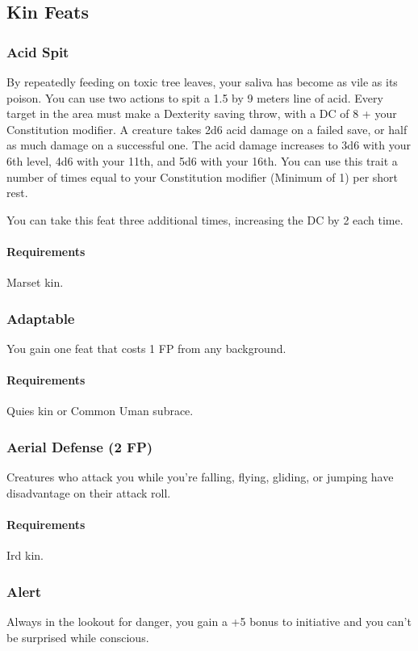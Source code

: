 \subsection*{Kin Feats}

\subsubsection{Acid Spit} \label{feat::acidspit}
    By repeatedly feeding on toxic tree leaves, your saliva has become as vile as its poison.
    You can use two actions to spit a 1.5 by 9 meters line of acid.
    Every target in the area must make a Dexterity saving throw, with a DC of 8 + your Constitution modifier.
    A creature takes 2d6 acid damage on a failed save, or half as much damage on a successful one.
    The acid damage increases to 3d6 with your 6th level, 4d6 with your 11th, and 5d6 with your 16th.
    You can use this trait a number of times equal to your Constitution modifier (Minimum of 1) per short rest.

    You can take this feat three additional times, increasing the DC by 2 each time.
    \paragraph{Requirements} Marset kin.
\subsubsection{Adaptable} \label{feat::adaptable}
    You gain one feat that costs 1 FP from any background.
    \paragraph{Requirements} Quies kin or Common Uman subrace.
\subsubsection{Aerial Defense (2 FP)} \label{feat::aerialdefense}
    Creatures who attack you while you're falling, flying, gliding, or jumping have disadvantage on their attack roll.
    \paragraph{Requirements} Ird kin.
\subsubsection{Alert} \label{feat::alert}
    Always in the lookout for danger, you gain a +5 bonus to initiative and you can't be surprised while conscious.
